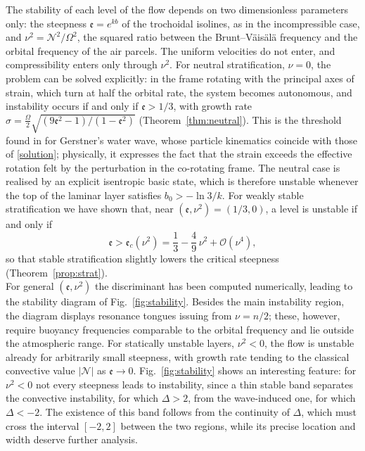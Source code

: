 \documentclass[reqno]{amsart}
\newcommand{\ee}{\mathfrak{e}}
\begin{document}
The stability of each level of the flow depends on two dimensionless parameters only: the steepness $\ee=e^{kb}$ of the trochoidal isolines, as in the incompressible case, and $\nu^2=\mathcal N^2/\Omega^2$, the squared ratio between the Brunt--V\"ais\"al\"a frequency and the orbital frequency of the air parcels. The uniform velocities do not enter, and compressibility enters only through $\nu^2$. For neutral stratification, $\nu=0$, the problem can be solved explicitly: in the frame rotating with the principal axes of strain, which turn at half the orbital rate, the system becomes autonomous, and instability occurs if and only if $\ee>1/3$, with growth rate $\sigma=\tfrac{\Omega}{2}\sqrt{(9\ee^2-1)/(1-\ee^2)}$ (Theorem~\ref{thm:neutral}). This is the threshold found in \cite{Leblanc2004} for Gerstner's water wave, whose particle kinematics coincide with those of \eqref{solution}; physically, it expresses the fact that the strain exceeds the effective rotation felt by the perturbation in the co-rotating frame. The neutral case is realised by an explicit isentropic basic state, which is therefore unstable whenever the top of the laminar layer satisfies $b_0>-\ln3/k$. For weakly stable stratification we have shown that, near $(\ee,\nu^2)=(1/3,0)$, a level is unstable if and only if
\begin{equation}\label{criterion}
\ee>\ee_c(\nu^2)=\frac13-\frac49\,\nu^2+\mathcal{O}(\nu^4),
\end{equation}
so that stable stratification slightly lowers the critical steepness (Theorem~\ref{prop:strat}). \\
For general $(\ee,\nu^2)$ the discriminant has been computed numerically, leading to the stability diagram of Fig.~\ref{fig:stability}. Besides the main instability region, the diagram displays resonance tongues issuing from $\nu=n/2$; these, however, require buoyancy frequencies comparable to the orbital frequency and lie outside the atmospheric range. For statically unstable layers, $\nu^2<0$, the flow is unstable already for arbitrarily small steepness, with growth rate tending to the classical convective value $|\mathcal N|$ as $\ee\to0$. Fig.~\ref{fig:stability} shows an interesting feature: for $\nu^2<0$ not every steepness leads to instability, since a thin stable band separates the convective instability, for which $\Delta>2$, from the wave-induced one, for which $\Delta<-2$. The existence of this band follows from the continuity of $\Delta$, which must cross the interval $[-2,2]$ between the two regions, while its precise location and width deserve further analysis.\\
\end{document}
